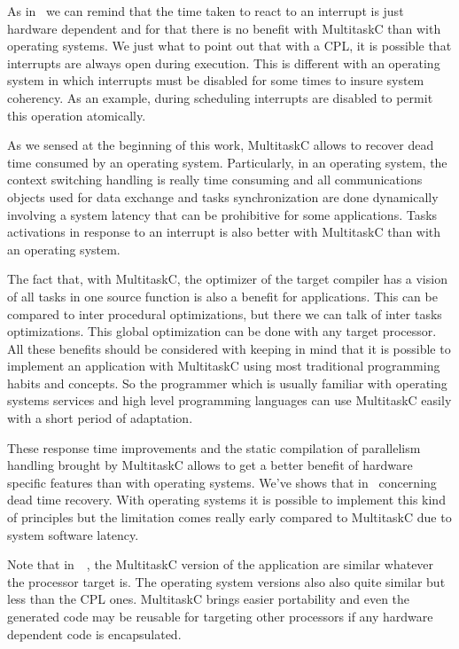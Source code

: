 \documentclass[10pt]{report}
\begin{document}
As in~\cite{Delchini:95} we can remind that the time taken to react to an interrupt is just hardware dependent
and for that there is no benefit with MultitaskC than with operating systems. We just what to point out that
with a CPL, it is possible that interrupts are always open during execution. This is different with an operating system
in which interrupts must be disabled for some times to insure system coherency. As an example, during scheduling
interrupts are disabled to permit this operation atomically.

As we sensed at the beginning of this work, MultitaskC allows to recover dead time consumed by an operating system.
Particularly, in an operating system, the context switching handling is really time consuming and all communications
objects used for data exchange and tasks synchronization are done dynamically involving a system latency that can
be prohibitive for some applications. Tasks activations in response to an interrupt is also better with MultitaskC
than with an operating system.

The fact that, with MultitaskC, the optimizer of the target compiler has a vision of all tasks in one source function
is also a benefit for applications. This can be compared to inter procedural optimizations, but there we can talk of
inter tasks optimizations. This global optimization can be done with any target processor. All these benefits should
be considered with keeping in mind that it is possible to implement an application with MultitaskC using most
traditional programming habits and concepts. So the programmer which is usually familiar with operating systems
services and high level programming languages can use MultitaskC easily with a short period of adaptation.

These response time improvements and the static compilation of parallelism handling brought by MultitaskC allows to
get a better benefit of hardware specific features than with operating systems. We've shows that in~\cite{Delchini:95}
concerning dead time recovery. With operating systems it is possible to implement this kind of principles but the
limitation comes really early compared to MultitaskC due to system software latency.

Note that in~~\cite{Delchini:95}, the MultitaskC version of the application are similar whatever the processor target
is. The operating system versions also also quite similar but less than the CPL ones. MultitaskC brings easier
portability and even the generated code may be reusable for targeting other processors if any hardware dependent
code is encapsulated.
\end{document}

